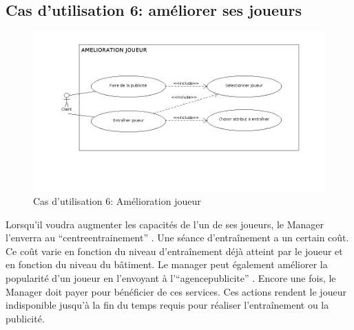 \documentclass[a4paper,titlepage]{scrreprt}
\begin{document}
  \subsection{Cas d'utilisation 6: améliorer ses joueurs}
  \begin{figure}[H]
    \center
    \includegraphics[scale=0.5]{uml/useCaseView/Ameliorationjoueur.png}
    \caption{Cas d'utilisation 6: Amélioration joueur}
  \end{figure}
  Lorsqu'il voudra augmenter les capacités de l'un de ses joueurs, 
  le Manager l'enverra au \enquote{\gls{centreentrainement}} . 
  Une séance d'entraînement a un certain coût. 
  Ce coût varie en fonction du niveau d'entraînement déjà atteint par le joueur et en fonction du niveau du bâtiment.
  Le manager peut également améliorer la popularité d'un joueur en l'envoyant à l'\enquote{\gls{agencepublicite}} . Encore une fois, le Manager doit payer pour bénéficier de ces services. Ces actions rendent le joueur indisponible jusqu'à la fin du temps requis pour réaliser l'entraînement ou la publicité.
\end{document}
